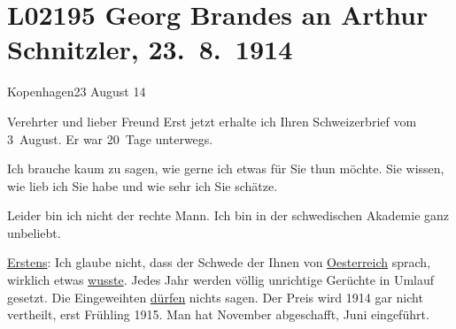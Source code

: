 

\section[Georg Brandes an Arthur Schnitzler, 23. 8. 1914]{L02195 Georg Brandes an Arthur Schnitzler, 23. 8. 1914}
\nopagebreak{}
\rehead{ }\normalsize\beginnumbering{}
\toendnotes[C]{\smallbreak\pagebreak[2]}
\toendnotes[C]{\smallbreak}
\pstart
           \raggedleft{}{\pb}Kopenhagen23 August 14\pend
           
\pstart{}Verehrter und lieber Freund\pend\vspace{0.5em}
\pstart
           Erst jetzt erhalte ich Ihren Schweizerbrief vom
                  3 August. Er war 20 Tage unterwegs.\pend
           
\pstart
           Ich brauche kaum zu sagen, wie gerne ich etwas für Sie thun möchte. Sie wissen, wie
               lieb ich Sie habe und wie sehr ich Sie schätze.\pend
           
\pstart
           Leider bin ich nicht der rechte Mann. Ich bin in der schwedischen Akademie ganz unbeliebt.\pend
           
\pstart
           \uline{Erstens}: Ich glaube nicht, dass der
                  Schwede der Ihnen von \uline{Oesterreich} sprach, wirklich etwas \uline{wusste}. Jedes Jahr
               werden völlig unrichtige Gerüchte in Umlauf gesetzt. Die Eingeweihten \uline{dürfen} nichts sagen. Der Preis wird 1914 gar
               nicht vertheilt, erst Frühling 1915. Man hat November abgeschafft, Juni
               eingeführt.\pend
           
